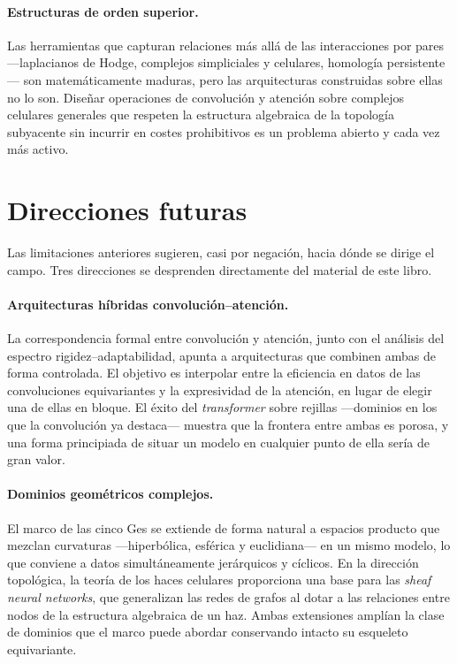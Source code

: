\paragraph{Estructuras de orden superior.}
Las herramientas que capturan relaciones m\'as all\'a de las interacciones por
pares ---laplacianos de Hodge, complejos simpliciales y celulares, homolog\'ia
persistente--- son matem\'aticamente maduras, pero las arquitecturas construidas
sobre ellas no lo son. Dise\~nar operaciones de convoluci\'on y atenci\'on sobre
complejos celulares generales que respeten la estructura algebraica de la
topolog\'ia subyacente sin incurrir en costes prohibitivos es un problema abierto
y cada vez m\'as activo.

\section{Direcciones futuras}
\label{sec:concl:future}

Las limitaciones anteriores sugieren, casi por negaci\'on, hacia d\'onde se
dirige el campo. Tres direcciones se desprenden directamente del material de este
libro.

\paragraph{Arquitecturas h\'ibridas convoluci\'on--atenci\'on.}
La correspondencia formal entre convoluci\'on y atenci\'on, junto con el
an\'alisis del espectro rigidez--adaptabilidad, apunta a arquitecturas que
combinen ambas de forma controlada. El objetivo es interpolar entre la eficiencia
en datos de las convoluciones equivariantes y la expresividad de la atenci\'on,
en lugar de elegir una de ellas en bloque. El \'exito del \emph{transformer}
sobre rejillas ---dominios en los que la convoluci\'on ya destaca--- muestra que
la frontera entre ambas es porosa, y una forma principiada de situar un modelo en
cualquier punto de ella ser\'ia de gran valor.

\paragraph{Dominios geom\'etricos complejos.}
El marco de las cinco Ges se extiende de forma natural a espacios producto que
mezclan curvaturas ---hiperb\'olica, esf\'erica y euclidiana--- en un mismo
modelo, lo que conviene a datos simult\'aneamente jer\'arquicos y c\'iclicos. En
la direcci\'on topol\'ogica, la teor\'ia de los haces celulares proporciona una
base para las \emph{sheaf neural networks}, que generalizan las redes de grafos al
dotar a las relaciones entre nodos de la estructura algebraica de un haz. Ambas
extensiones ampl\'ian la clase de dominios que el marco puede abordar conservando
intacto su esqueleto equivariante.


